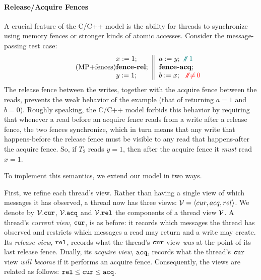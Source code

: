 \paragraph{Release/Acquire Fences}

A crucial feature of the C/C++ model is the ability for threads to synchronize using memory fences or stronger kinds of atomic accesses.
Consider the message-passing test case:
\begin{equation}\label{eq:MPfences}\tag{MP+fences}
\inarrII{ x:=1 ;\\ \fencerel ;\\ y:=1; }{  a:=y; \comment{1} \\ \fenceacq;\\ b:=x; \nocomment{0} }
\end{equation}
The release fence between the writes, together with the acquire fence
between the reads, prevents the weak behavior of the example (\ie that
of returning $a=1$ and $b=0$).  Roughly speaking, the C/C++ model
forbids this behavior by requiring that whenever a read before an
acquire fence reads from a write after a release fence, the two fences
synchronize, which in turn means that any write that happens-before the release
fence must be visible to any read that happens-after the acquire fence.  So, if $T_2$
reads $y=1$, then after the acquire fence it \emph{must} read $x=1$.


To implement this semantics, we extend our model in two ways.

First, we refine each thread's view.  Rather than having a single view
of which messages it has observed, a thread now has three views:
${\cal V}={\langle{cur,acq,rel}\rangle}$.  We denote by ${\cal V}.{\texttt{cur}}$,
${\cal V}.{\texttt{acq}}$ and ${\cal V}.{\texttt{rel}}$ the components of a thread view
${\cal V}$.  A thread's \emph{current view}, ${\texttt{cur}}$, is as before: it records
which messages the thread has observed and restricts which messages a
read may return and a write may create.  Its \emph{release view}, ${\texttt{rel}}$,
records what the thread's ${\texttt{cur}}$ view \emph{was} at the point of its
last release fence.
Dually, its \emph{acquire view}, ${\texttt{acq}}$, records what the thread's ${\texttt{cur}}$
view \emph{will become} if it performs an acquire fence.
Consequently, the views are related as follows:
${\texttt{rel}} \leq {\texttt{cur}} \leq {\texttt{acq}}$.

